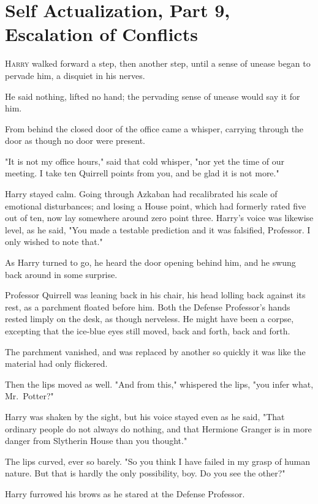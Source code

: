 \chapter{Self Actualization, Part 9, Escalation of Conflicts}

\lettrine{H}{arry} walked
forward a step, then another step, until a sense of unease began to pervade
him, a disquiet in his nerves.

He said nothing, lifted no hand; the pervading sense of unease would say it for
him.

From behind the closed door of the office came a whisper, carrying through the
door as though no door were present.

"It is not my office hours," said that cold whisper, "nor yet the time of our
meeting. I take ten Quirrell points from you, and be glad it is not more."

Harry stayed calm. Going through Azkaban had recalibrated his scale of
emotional disturbances; and losing a House point, which had formerly rated five
out of ten, now lay somewhere around zero point three. Harry's voice was
likewise level, as he said, "You made a testable prediction and it was
falsified, Professor. I only wished to note that."

As Harry turned to go, he heard the door opening behind him, and he swung back
around in some surprise.

Professor Quirrell was leaning back in his chair, his head lolling back against
its rest, as a parchment floated before him. Both the Defense Professor's hands
rested limply on the desk, as though nerveless. He might have been a corpse,
excepting that the ice-blue eyes still moved, back and forth, back and forth.

The parchment vanished, and was replaced by another so quickly it was like the
material had only flickered.

Then the lips moved as well. "And from this," whispered the lips, "you infer
what, Mr.~Potter?"

Harry was shaken by the sight, but his voice stayed even as he said, "That
ordinary people do not always do nothing, and that Hermione Granger is in more
danger from Slytherin House than you thought."

The lips curved, ever so barely. "So you think I have failed in my grasp of
human nature. But that is hardly the only possibility, boy. Do you see the
other?"

Harry furrowed his brows as he stared at the Defense Professor.

